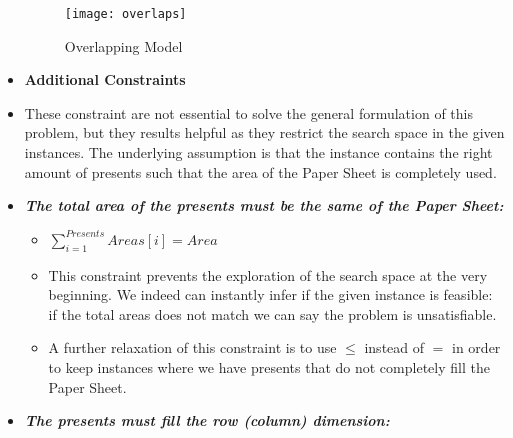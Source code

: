 \begin{itemize}
        \begin{figure}
            \centering
            \texttt{[image: overlaps]}
            \caption{Overlapping Model}
            \label{fig:overlaps}
        \end{figure}

    \item[] \textbf{Additional Constraints}
    \item[] These constraint are not essential to solve the general formulation of this problem,
        but they results helpful as they restrict the search space in the given instances.
        The underlying assumption is that the instance contains the right amount of presents such
        that the area of the Paper Sheet is completely used.
    \item \textbf{\textit{The total area of the presents must be the same of the Paper Sheet:}}
        \begin{itemize}
            \item[] $\sum_{i = 1}^{Presents}{Areas[i]} = Area$
            \item[] This constraint prevents the exploration of the search space
                at the very beginning. We indeed can instantly infer if the given instance is
                feasible: if the total areas does not match we can say the problem is unsatisfiable.
            \item[] A further relaxation of this constraint is to use $\leq$ instead of $=$ in order 
                to keep instances where we have presents that do not completely fill the Paper Sheet. 
        \end{itemize}
    \item \textbf{\textit{The presents must fill the row (column) dimension:}}
\end{itemize}
